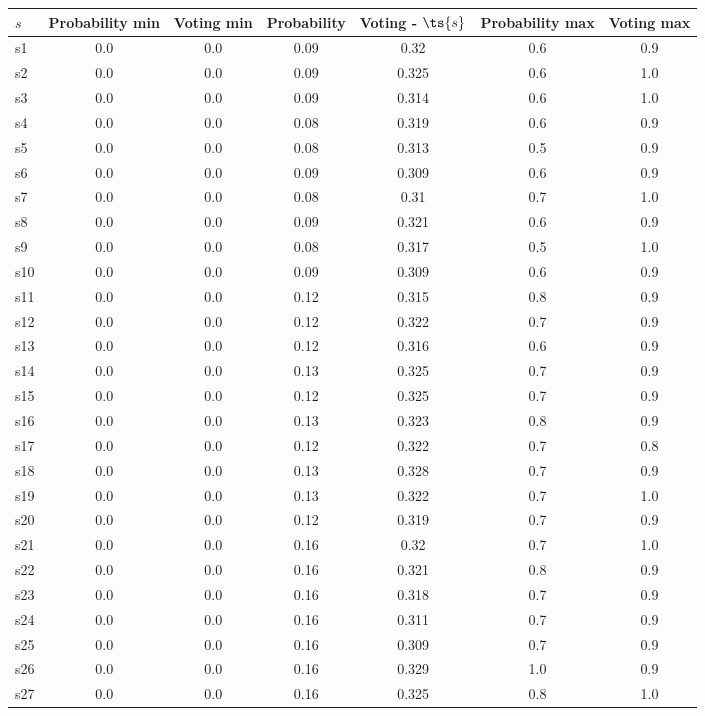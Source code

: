 \documentclass{article}
\begin{document}
\noindent\begin{tabular}{|l|c|c|c|c|c|c|}
\hline
$s$& Probability min & Voting min & Probability & Voting - $\ts{s}$ & Probability max & Voting max\\
\hline
s1 &0.0 & 0.0 & 0.09 & 0.32 & 0.6 & 0.9\\
\hline
s2 &0.0 & 0.0 & 0.09 & 0.325 & 0.6 & 1.0\\
\hline
s3 &0.0 & 0.0 & 0.09 & 0.314 & 0.6 & 1.0\\
\hline
s4 &0.0 & 0.0 & 0.08 & 0.319 & 0.6 & 0.9\\
\hline
s5 &0.0 & 0.0 & 0.08 & 0.313 & 0.5 & 0.9\\
\hline
s6 &0.0 & 0.0 & 0.09 & 0.309 & 0.6 & 0.9\\
\hline
s7 &0.0 & 0.0 & 0.08 & 0.31 & 0.7 & 1.0\\
\hline
s8 &0.0 & 0.0 & 0.09 & 0.321 & 0.6 & 0.9\\
\hline
s9 &0.0 & 0.0 & 0.08 & 0.317 & 0.5 & 1.0\\
\hline
s10 &0.0 & 0.0 & 0.09 & 0.309 & 0.6 & 0.9\\
\hline
s11 &0.0 & 0.0 & 0.12 & 0.315 & 0.8 & 0.9\\
\hline
s12 &0.0 & 0.0 & 0.12 & 0.322 & 0.7 & 0.9\\
\hline
s13 &0.0 & 0.0 & 0.12 & 0.316 & 0.6 & 0.9\\
\hline
s14 &0.0 & 0.0 & 0.13 & 0.325 & 0.7 & 0.9\\
\hline
s15 &0.0 & 0.0 & 0.12 & 0.325 & 0.7 & 0.9\\
\hline
s16 &0.0 & 0.0 & 0.13 & 0.323 & 0.8 & 0.9\\
\hline
s17 &0.0 & 0.0 & 0.12 & 0.322 & 0.7 & 0.8\\
\hline
s18 &0.0 & 0.0 & 0.13 & 0.328 & 0.7 & 0.9\\
\hline
s19 &0.0 & 0.0 & 0.13 & 0.322 & 0.7 & 1.0\\
\hline
s20 &0.0 & 0.0 & 0.12 & 0.319 & 0.7 & 0.9\\
\hline
s21 &0.0 & 0.0 & 0.16 & 0.32 & 0.7 & 1.0\\
\hline
s22 &0.0 & 0.0 & 0.16 & 0.321 & 0.8 & 0.9\\
\hline
s23 &0.0 & 0.0 & 0.16 & 0.318 & 0.7 & 0.9\\
\hline
s24 &0.0 & 0.0 & 0.16 & 0.311 & 0.7 & 0.9\\
\hline
s25 &0.0 & 0.0 & 0.16 & 0.309 & 0.7 & 0.9\\
\hline
s26 &0.0 & 0.0 & 0.16 & 0.329 & 1.0 & 0.9\\
\hline
s27 &0.0 & 0.0 & 0.16 & 0.325 & 0.8 & 1.0\\

\end{tabular}
\end{document}
